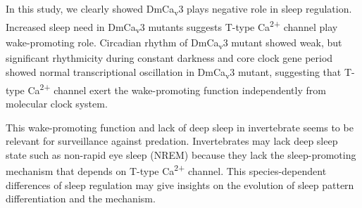 In this study, we clearly showed DmCa\textsubscript{v}3 plays negative role in sleep regulation.
Increased sleep need in DmCa\textsubscript{v}3 mutants suggests T-type Ca\textsuperscript{2+} channel play wake-promoting role.
Circadian rhythm of DmCa\textsubscript{v}3 mutant showed weak, but significant rhythmicity during constant darkness and core clock gene period showed normal transcriptional oscillation in DmCa\textsubscript{v}3 mutant, suggesting that T-type Ca\textsuperscript{2+} channel exert the wake-promoting function independently from molecular clock system.

This wake-promoting function and lack of deep sleep in invertebrate seems to be relevant for surveillance against predation.
Invertebrates may lack deep sleep state such as non-rapid eye sleep (NREM) because they lack the sleep-promoting mechanism that depends on T-type Ca\textsuperscript{2+} channel.
This species-dependent differences of sleep regulation may give insights on the evolution of sleep pattern differentiation and the mechanism.
  
  
  
  
  
  
  